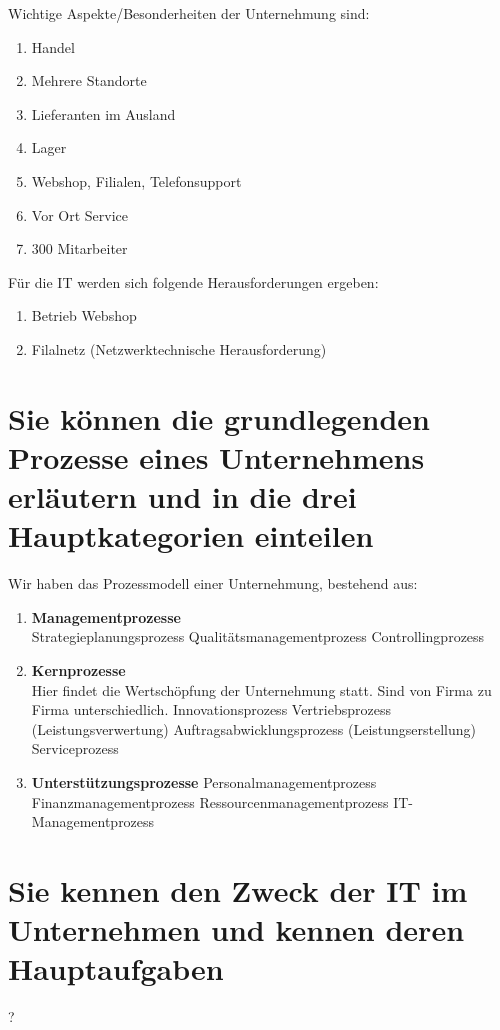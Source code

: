 Wichtige Aspekte/Besonderheiten der Unternehmung sind:
\begin{enumerate}
	\item Handel
	\item Mehrere Standorte
	\item Lieferanten im Ausland
	\item Lager
	\item Webshop, Filialen, Telefonsupport
	\item Vor Ort Service
	\item 300 Mitarbeiter
\end{enumerate}

Für die IT werden sich folgende Herausforderungen ergeben:
\begin{enumerate}
	\item Betrieb Webshop
	\item Filalnetz (Netzwerktechnische Herausforderung)
\end{enumerate}
\section{Sie können die grundlegenden Prozesse eines Unternehmens erläutern und in die drei Hauptkategorien einteilen}
Wir haben das Prozessmodell einer Unternehmung, bestehend aus:
\begin{enumerate}
	\item \textbf{Managementprozesse} \\
		\subitem Strategieplanungsprozess
		\subitem Qualitätsmanagementprozess
		\subitem Controllingprozess
	\item \textbf{Kernprozesse} \\
		Hier findet die Wertschöpfung der Unternehmung statt. Sind von Firma zu Firma unterschiedlich.
		\subitem Innovationsprozess
		\subitem Vertriebsprozess (Leistungsverwertung)
		\subitem Auftragsabwicklungsprozess (Leistungserstellung)
		\subitem Serviceprozess
	\item \textbf{Unterstützungsprozesse}
		\subitem Personalmanagementprozess
		\subitem Finanzmanagementprozess
		\subitem Ressourcenmanagementprozess
		\subitem IT-Managementprozess
\end{enumerate}
\section{Sie kennen den Zweck der IT im Unternehmen und kennen deren Hauptaufgaben}
?